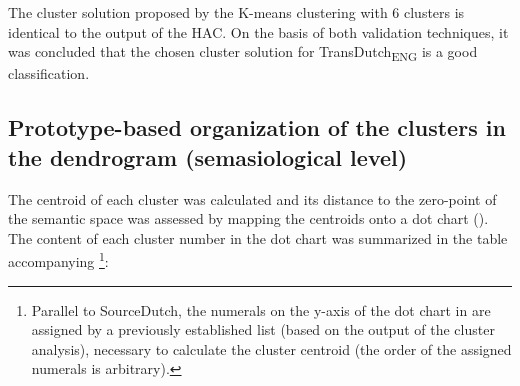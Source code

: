 The cluster solution proposed by the K-means clustering with 6 clusters is identical to the output of the HAC. On the basis of both validation techniques, it was concluded that the chosen cluster solution for TransDutch\textsubscript{ENG} is a good classification.

\subsection{Prototype-based organization of the clusters in the dendrogram (semasiological level)}
\label{sec:4.3.2}  
The centroid of each cluster was calculated and its distance to the zero-point of the semantic space was assessed by mapping the centroids onto a dot chart (). The content of each cluster number in the dot chart was summarized in the table accompanying \footnote{Parallel to SourceDutch, the numerals on the y-axis of the dot chart in  are assigned by a previously established list (based on the output of the cluster analysis), necessary to calculate the cluster centroid (the order of the assigned numerals is arbitrary).}:

